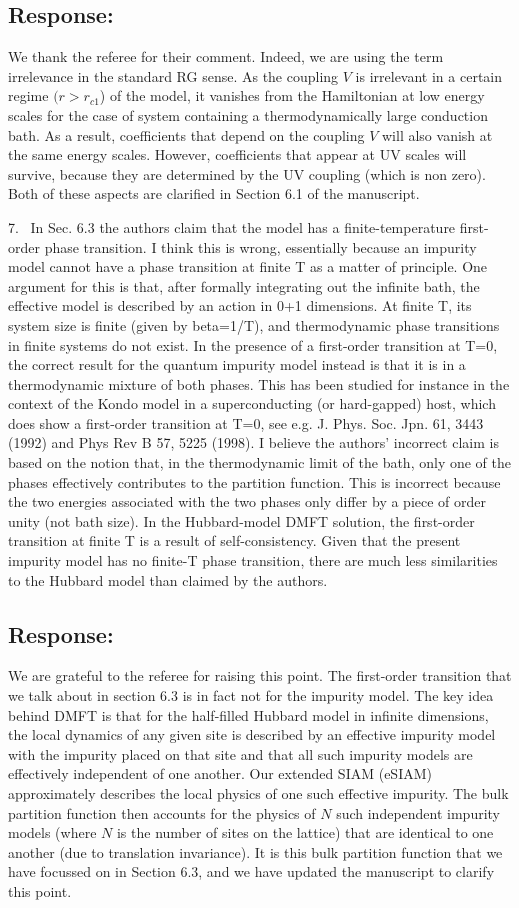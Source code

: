 \documentclass{article}
\newcommand{\response}[1]{{\color{blue}\subsection*{Response:}{#1}\vspace*{10pt}}}
\begin{document}
\response{
	We thank the referee for their comment. Indeed, we are using the term irrelevance in the standard RG sense. As the coupling \(V\) is irrelevant in a certain regime \((r > r_{c1}\)) of the model, it vanishes from the Hamiltonian at low energy scales for the case of system containing a thermodynamically large conduction bath. As a result, coefficients that depend on the coupling \(V\) will also vanish at the same energy scales. However, coefficients that appear at UV scales will survive, because they are determined by the UV coupling (which is non zero). Both of these aspects are clarified in Section 6.1 of the manuscript.
}

7.~
In Sec. 6.3 the authors claim that the model has a finite-temperature first-order phase transition. I think this is wrong, essentially because an impurity model cannot have a phase transition at finite T as a matter of principle. One argument for this is that, after formally integrating out the infinite bath, the effective model is described by an action in 0+1 dimensions. At finite T, its system size is finite (given by beta=1/T), and thermodynamic phase transitions in finite systems do not exist. In the presence of a first-order transition at T=0, the correct result for the quantum impurity model instead is that it is in a thermodynamic mixture of both phases. This has been studied for instance in the context of the Kondo model in a superconducting (or hard-gapped) host, which does show a first-order transition at T=0, see e.g. J. Phys. Soc. Jpn. 61, 3443 (1992) and Phys Rev B 57, 5225 (1998).
I believe the authors' incorrect claim is based on the notion that, in the thermodynamic limit of the bath, only one of the phases effectively contributes to the partition function. This is incorrect because the two energies associated with the two phases only differ by a piece of order unity (not bath size). In the Hubbard-model DMFT solution, the first-order transition at finite T is a result of self-consistency. Given that the present impurity model has no finite-T phase transition, there are much less similarities to the Hubbard model than claimed by the authors.

\response{
We are grateful to the referee for raising this point. The first-order transition that we talk about in section 6.3 is in fact not for the impurity model. The key idea behind DMFT is that for the half-filled Hubbard model in infinite dimensions, the local dynamics of any given site is described by an effective impurity model with the impurity placed on that site and that all such impurity models are effectively independent of one another. Our extended SIAM (eSIAM) approximately describes the local physics of one such effective impurity. The bulk partition function then accounts for the physics of $N$ such independent impurity models (where $N$ is the number of sites on the lattice) that are identical to one another (due to translation invariance). It is this bulk partition function that we have focussed on in Section 6.3, and we have updated the manuscript to clarify this point.
}
\end{document}

